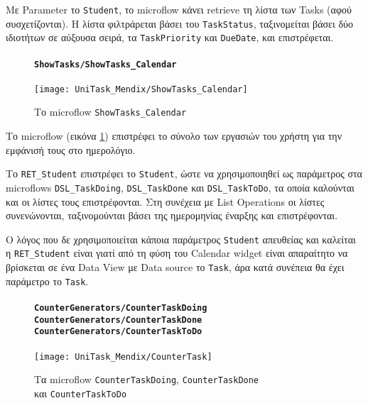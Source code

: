                Με Parameter το \texttt{Student}, το microflow κάνει retrieve τη λίστα των Tasks (αφού συσχετίζονται). Η λίστα φιλτράρεται βάσει του \texttt{TaskStatus}, ταξινομείται βάσει δύο ιδιοτήτων σε αύξουσα σειρά, τα \texttt{TaskPriority} και \texttt{DueDate}, και επιστρέφεται.

                \begin{figure}[H] \noindent
                    \paragraph{\texttt{ShowTasks/ShowTasks\_Calendar}}
                    \begin{center}
                        \texttt{[image: UniTask\_Mendix/ShowTasks\_Calendar]}
                        \caption{\centering Το microflow \texttt{ShowTasks\_Calendar}}
                        \label{fig:unitask_ShowTasks_Calendar}
                    \end{center}
                \end{figure}

                Το microflow (εικόνα \ref{fig:unitask_ShowTasks_Calendar}) επιστρέφει το σύνολο των εργασιών του χρήστη για την εμφάνισή τους στο ημερολόγιο.

                Το \texttt{RET\_Student} επιστρέφει το \texttt{Student}, ώστε να χρησιμοποιηθεί ως παράμετρος στα microflows \texttt{DSL\_TaskDoing}, \texttt{DSL\_TaskDone} και \texttt{DSL\_TaskToDo}, τα οποία καλούνται και οι λίστες τους επιστρέφονται. Στη συνέχεια με List Operations οι λίστες συνενώνονται, ταξινομούνται βάσει της ημερομηνίας έναρξης και επιστρέφονται.

                Ο λόγος που δε χρησιμοποιείται κάποια παράμετρος \texttt{Student} απευθείας και καλείται η \texttt{RET\_Student} είναι γιατί από τη φύση του Calendar widget είναι απαραίτητο να βρίσκεται σε ένα Data View με Data source το \texttt{Task}, άρα κατά συνέπεια θα έχει παράμετρο το \texttt{Task}.

                \begin{figure}[H] \noindent
                    \paragraph{\texttt{CounterGenerators/CounterTaskDoing} \\ \texttt{CounterGenerators/CounterTaskDone} \\ \texttt{CounterGenerators/CounterTaskToDo}}
                    \begin{center}
                        \texttt{[image: UniTask\_Mendix/CounterTask]}
                        \caption{\centering Τα microflow \texttt{CounterTaskDoing}, \texttt{CounterTaskDone} \\ και \texttt{CounterTaskToDo}}
                        \label{fig:unitask_CounterTask}
                    \end{center}
                \end{figure}

